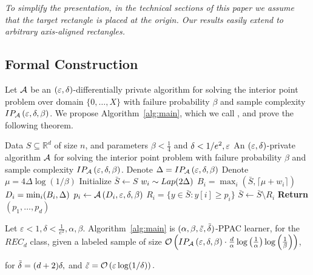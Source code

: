 \documentclass[12pt,a4paper,oneside,onecolumn]{book}
\begin{document}
\begin{myremark}{\em
To simplify the presentation, in the technical sections of this paper we assume that the target rectangle is placed at the origin. Our results easily extend to arbitrary axis-aligned rectangles.
}\end{myremark}


\subsection{Formal Construction}

Let $\mathcal{A}$ be an $(\varepsilon, \delta)$-differentially private algorithm for solving the interior point problem over domain $\{0,\ldots,X\}$ with failure probability $\beta$ and sample complexity $IP_{\mathcal{A}}\left(\varepsilon,\delta,\beta\right)$. 
We propose Algorithm~\ref{alg:main}, which we call , and prove the following theorem.

\begin{algorithm}[ht]
   \caption{}
   \label{alg:main}
\begin{algorithmic}
    Data $S\subseteq \mathbb{R}^d$ of size $n$, and parameters $\beta < \frac{1}{4}$ and $\delta < 1/e^2,\varepsilon$ %
    An $(\varepsilon, \delta)$-private algorithm $\mathcal{A}$ for solving the interior point problem with failure probability $\beta$ and sample complexity  $IP_{\mathcal{A}}\left(\varepsilon,\delta,\beta\right)$.\vspace{5pt}
   \State Denote $\Delta = IP_{\mathcal{A}}\left(\varepsilon,\delta,\beta\right)$
   \State Denote $\mu = 4 \Delta \log(1/\beta)$
    \State Initialize $\bar{S} \leftarrow S$
   \State $w_i \sim Lap(2\Delta)$
   \State $B_i = \max_i(\bar{S},\lceil \mu + w_i \rceil)$
   \State $D_{i} = \min_i(B_i, \Delta)$
   \State $p_i \leftarrow \mathcal{A}\left(D_{i},\varepsilon,\delta,\beta\right)$
   \State $R_i = \{y\in \bar{S} : y[i] \geq p_i\}$
   \State $\bar{S} \leftarrow \bar{S}\setminus R_i$
   \EndFor
   \State \textbf{Return} $(p_1,\ldots,p_d)$
\end{algorithmic}
\end{algorithm}

\begin{theorem}\label{thm:main}
Let $\varepsilon < 1 , \delta < \frac{1}{e^2}, \alpha, \beta$. 
Algorithm~\ref{alg:main} is 
$(\alpha,\beta,\tilde{\varepsilon},\tilde{\delta})$-PPAC learner, for the $REC_d$ class,
given a labeled sample of size
$\mathcal{O}\left( IP_{\mathcal{A}}\left(\varepsilon,\delta,\beta\right)\cdot  \frac{d}{\alpha}\log\left(\frac{1}{\alpha}\right)
\log\left(\frac{1}{\beta}\right)\right)$, 

for
$
\tilde{\delta} = (d+2)\delta,$
and 
$
\tilde{\varepsilon} = \mathcal{O}\left(\varepsilon\log(1/\delta)\right).
$
\end{theorem}
\end{document}
